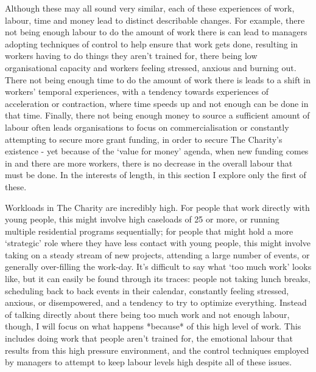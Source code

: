 Although these may all sound very similar, each of these experiences of work, labour, time and money lead to distinct describable changes. For example, there not being enough labour to do the amount of work there is can lead to managers adopting techniques of control to help ensure that work gets done, resulting in workers having to do things they aren’t trained for, there being low organisational capacity and workers feeling stressed, anxious and burning out. There not being enough time to do the amount of work there is leads to a shift in workers’ temporal experiences, with a tendency towards experiences of acceleration or contraction, where time speeds up and not enough can be done in that time. Finally, there not being enough money to source a sufficient amount of labour often leads organisations to focus on commercialisation or constantly attempting to secure more grant funding, in order to secure The Charity’s existence - yet because of the ‘value for money’ agenda, when new funding comes in and there are more workers, there is no decrease in the overall labour that must be done. In the interests of length, in this section I explore only the first of these. %

Workloads in The Charity are incredibly high. For people that work directly with young people, this might involve high caseloads of 25 or more, or running multiple residential programs sequentially; for people that might hold a more ‘strategic’ role where they have less contact with young people, this might involve taking on a steady stream of new projects, attending a large number of events, or generally over-filling the work-day. It’s difficult to say what ‘too much work’ looks like, but it can easily be found through its traces: people not taking lunch breaks, scheduling back to back events in their calendar, constantly feeling stressed, anxious, or disempowered, and a tendency to try to optimize everything. Instead of talking directly about there being too much work and not enough labour, though, I will focus on what happens *because* of this high level of work. This includes doing work that people aren’t trained for, the emotional labour that results from this high pressure environment, and the control techniques employed by managers to attempt to keep labour levels high despite all of these issues. 

